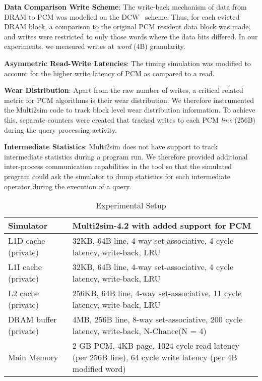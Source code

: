 \textbf{Data Comparison Write Scheme}: 
The write-back mechanism of data from DRAM to PCM was modelled on the
DCW~\cite{write} scheme. Thus, for each evicted DRAM block, a comparison
to the original PCM resident data block was made, and writes were
restricted to only those words where the data bits differed. In our
experiments, we measured writes at \textit{word} (4B) granularity.

\textbf{Asymmetric Read-Write Latencies}:  
The timing simulation was modified to account for the higher write
latency of PCM as compared to a read.

\textbf{Wear Distribution}: 
Apart from the raw number of writes, a critical related metric for PCM
algorithms is their wear distribution. We therefore instrumented the
Multi2sim code to track block level wear distribution information. To
achieve this, separate counters were created that tracked writes to each
PCM \textit{line} (256B) during the query processing activity.

\textbf{Intermediate Statistics}: 
Multi2sim does not have support to track intermediate statistics during
a program run. We therefore provided additional inter-process communication capabilities in the
tool so that the simulated program could ask the simulator to dump
statistics for each intermediate operator during the execution of a query.


\begin{center}
\begin{table}[t]
\begin{small}
\caption{Experimental Setup}
\label{table:setup}
\begin{tabular}{p{2.5cm}p{10cm}}
\toprule
Simulator & Multi2sim-4.2 with added support for PCM\\ \hline

L1D cache (private) & 32KB, 64B line, 4-way set-associative, 4 cycle latency, write-back, LRU\\ \hline
L1I cache (private) & 32KB, 64B line, 4-way set-associative, 4 cycle latency, write-back, LRU\\ \hline   
L2 cache (private) & 256KB, 64B line, 4-way set-associative, 11 cycle latency, write-back, LRU\\ \hline

DRAM buffer (private) & 4MB, 256B line, 8-way set-associative, 200 cycle latency, write-back, N-Chance(N = 4)\\ \hline

Main Memory & 2 GB PCM, 4KB page, 1024 cycle read latency (per 256B line), 64 cycle write latency (per 4B modified word)\\ \bottomrule
\end{tabular}
\end{small}
\end{table}
\end{center}

